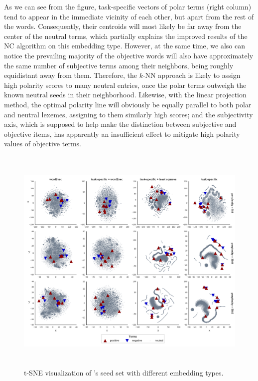 As we can see from the figure, task-specific vectors of polar terms
(right column) tend to appear in the immediate vicinity of each other,
but apart from the rest of the words.  Consequently, their centroids
will most likely be far away from the center of the neutral terms,
which partially explains the improved results of the NC algorithm on
this embedding type.  However, at the same time, we also can notice
the prevailing majority of the objective words will also have
approximately the same number of subjective terms among their
neighbors, being roughly equidistant away from them.  Therefore, the
$k$-NN approach is likely to assign high polarity scores to many
neutral entries, once the polar terms outweigh the known neutral seeds
in their neighborhood.  Likewise, with the linear projection method,
the optimal polarity line will obviously be equally parallel to both
polar and neutral lexemes, assigning to them similarly high scores;
and the subjectivity axis, which is supposed to help make the
distinction between subjective and objective items, has apparently an
insufficient effect to mitigate high polarity values of objective
terms.

\begin{figure}[hbtp]
  \centering
  \includegraphics[height=30em,width=\linewidth]{img/potts_embeddings.png}
  \caption[Visualization of \citeauthor{Turney:03}'s seed set]{t-SNE
    visualization of \citeauthor{Turney:03}'s seed set with different
    embedding types.}\label{snt:fig:tsne-seeds}
\end{figure}


